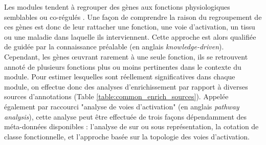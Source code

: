 Les modules tendent à regrouper des gènes aux fonctions physiologiques semblables ou co-régulés \cite{Barabasi2011Jan,Lorenz2011}. Une façon de comprendre la raison du regroupement de ces gènes est donc de leur rattacher une fonction, une voie d'activation, un tissu ou une maladie dans laquelle ils interviennent. Cette approche est alors qualifiée de guidée par la connaissance préalable (en anglais \textit{knowledge-driven}). Cependant, les gènes œuvrant rarement à une seule fonction, ils se retrouvent annoté de plusieurs fonctions \cite{Green2006Aug} plus ou moins pertinentes dans le contexte du module. Pour estimer lesquelles sont réellement significatives dans chaque module, on effectue donc des analyses d'enrichissement \cite{Khatri2012} par rapport à diverses sources d'annotations (Table \ref{table:common_enrich_sources}). Appelée également par raccourci "analyse de voies d'activation" (en anglais \textit{pathway analysis}), cette analyse peut être effectuée de trois façons dépendamment des méta-données disponibles : l'analyse de sur ou sous représentation, la cotation de classe fonctionnelle, et l'approche basée sur la topologie des voies d'activation. 


